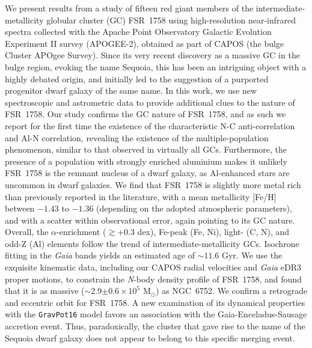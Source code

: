 \documentclass[longauth]{aa} %
\begin{document}
	\date{Received ...; Accepted ...}
	
	
	\abstract
	{
We present results from a study of fifteen red giant members of the intermediate-metallicity globular cluster (GC) FSR~1758 using high-resolution near-infrared spectra collected with the Apache Point Observatory Galactic Evolution Experiment II survey (APOGEE-2), obtained as part of CAPOS (the bulge Cluster APOgee Survey). Since its very recent discovery as a massive GC in the bulge region, evoking the name Sequoia, this has been an intriguing object with a highly debated origin, and initially led to the suggestion of a purported progenitor dwarf galaxy of the same name. In this work, we use new spectroscopic and astrometric data to provide additional clues to the nature of FSR~1758. Our study confirms the GC nature of FSR~1758, and as such we report for the first time the existence of the characteristic N-C anti-correlation and Al-N correlation, revealing the existence of the multiple-population phenomenon, similar to that observed in virtually all GCs. Furthermore, the presence of a population with strongly enriched aluminium makes it unlikely FSR~1758 is the remnant nucleus of a dwarf galaxy, as Al-enhanced stars are uncommon in dwarf galaxies. We find that FSR~1758 is slightly more metal rich than previously reported in the literature, with a mean metallicity [Fe/H] between $-1.43$ to $-1.36$ (depending on the adopted atmospheric parameters), and with a scatter within observational error, again pointing to its GC nature. Overall, the $\alpha$-enrichment ($\gtrsim+0.3$ dex), Fe-peak (Fe, Ni), light- (C, N), and odd-Z (Al) elements follow the trend of intermediate-metallicity GCs.   Isochrone fitting in the \textit{Gaia} bands yields an estimated age of $\sim11.6$ Gyr. We use the exquisite kinematic data, including our CAPOS radial velocities and \textit{Gaia} eDR3 proper motions, to constrain the \textit{N}-body density profile of FSR~1758, and found that it is as massive ($\sim$2.9$\pm 0.6 \times 10^{5}$ M$_{\odot}$) as NGC~6752.  We confirm a retrograde and eccentric orbit  for FSR~1758. A new examination of its dynamical properties with the \texttt{GravPot16} model favors an association with the Gaia-Enceladus-Sausage accretion event. Thus, paradoxically, the cluster that gave rise to the name of the Sequoia dwarf galaxy does not appear to belong to this specific merging event.
}
	
\end{document}
